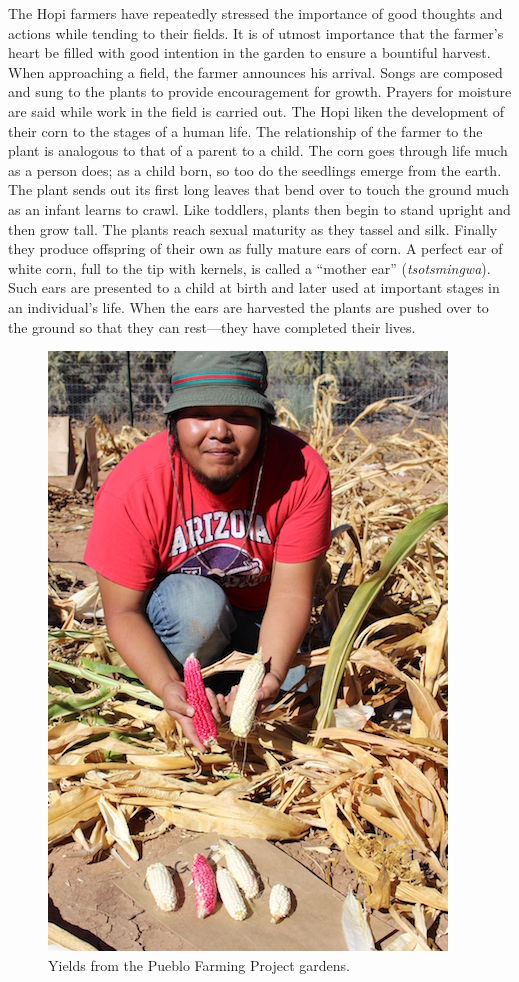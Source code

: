 \documentclass[12pt,]{article}
\begin{document}
The Hopi farmers have repeatedly stressed the importance of good thoughts and actions while tending to their fields. It is of utmost importance that the farmer's heart be filled with good intention in the garden to ensure a bountiful harvest. When approaching a field, the farmer announces his arrival. Songs are composed and sung to the plants to provide encouragement for growth. Prayers for moisture are said while work in the field is carried out. The Hopi liken the development of their corn to the stages of a human life. The relationship of the farmer to the plant is analogous to that of a parent to a child. The corn goes through life much as a person does; as a child born, so too do the seedlings emerge from the earth. The plant sends out its first long leaves that bend over to touch the ground much as an infant learns to crawl. Like toddlers, plants then begin to stand upright and then grow tall. The plants reach sexual maturity as they tassel and silk. Finally they produce offspring of their own as fully mature ears of corn. A perfect ear of white corn, full to the tip with kernels, is called a ``mother ear'' (\emph{tsotsmingwa}). Such ears are presented to a child at birth and later used at important stages in an individual's life. When the ears are harvested the plants are pushed over to the ground so that they can rest---they have completed their lives.

\begin{figure}
\centering
\includegraphics{./images/chapter_6_yields.jpg}
\caption{Yields from the Pueblo Farming Project gardens.}
\end{figure}
\end{document}
